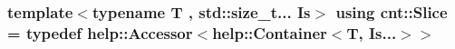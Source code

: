 \subsubsection[{\texorpdfstring{Slice}{Slice}}]{\setlength{\rightskip}{0pt plus 5cm}template$<$typename T , std\+::size\+\_\+t... Is$>$ using {\bf cnt\+::\+Slice} = typedef {\bf help\+::\+Accessor}$<${\bf help\+::\+Container}$<$T, Is...$>$$>$}\hypertarget{namespacecnt_acf6d6a181a8c170689b959f3d6a36813}{}\label{namespacecnt_acf6d6a181a8c170689b959f3d6a36813}
